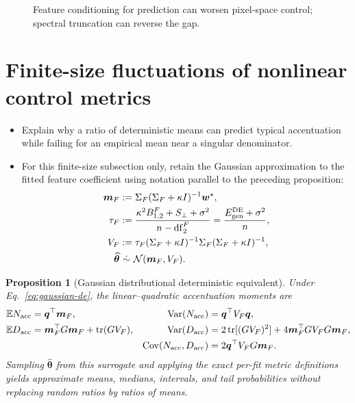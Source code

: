 \documentclass[11pt]{article}
\newtheorem{proposition}[theorem]{Proposition}
\newcommand{\E}{\mathbb{E}}
\newcommand{\tr}{\operatorname{tr}}
\newcommand{\Var}{\operatorname{Var}}
\newcommand{\Cov}{\operatorname{Cov}}
\newcommand{\that}{\widehat{\bm\theta}}
\begin{document}
\begin{figure}[t]
  \centering
  \caption{Feature conditioning for prediction can worsen pixel-space control;
  spectral truncation can reverse the gap.}
  \label{fig:feature-comparison}
\end{figure}

\section{Finite-size fluctuations of nonlinear control metrics}
\label{sec:distributional-de}

\begin{itemize}
  \item Explain why a ratio of deterministic means can predict typical
        accentuation while failing for an empirical mean near a singular
        denominator.
  \item For this finite-size subsection only, retain the Gaussian approximation
        to the fitted feature coefficient using notation parallel to the
        preceding proposition:
  \begin{align}
    \bm m_F
      &:=\Sigma_F(\Sigma_F+\kappa I)^{-1}\bm w^{\star},\\
    \tau_F
      &:=\frac{\kappa^2B^F_{1,2}+S_{\perp}+\sigma^2}
                   {n-\mathrm{df}^{F}_{2}}
       =\frac{E_{\rm gen}^{\rm DE}+\sigma^2}{n},\\
    V_F
      &:=\tau_F(\Sigma_F+\kappa I)^{-1}
                    \Sigma_F(\Sigma_F+\kappa I)^{-1},\\
    \that
      &\ \dot\sim\ \mathcal N(\bm m_F,V_F).
    \label{eq:gaussian-de}
  \end{align}
\end{itemize}

\begin{proposition}[Gaussian distributional deterministic equivalent]
\label{prop:gaussian-de}
Under Eq.~\eqref{eq:gaussian-de}, the linear--quadratic accentuation moments
are
\begin{align}
  \E N_{\rm acc}&=\bm q^{\top}\bm m_F,
  &\Var(N_{\rm acc})&=\bm q^{\top}V_F\bm q,\\
  \E D_{\rm acc}&=\bm m_F^{\top}G\bm m_F+\tr(GV_F),
  &\Var(D_{\rm acc})
    &=2\tr[(GV_F)^2]+4\bm m_F^{\top}GV_FG\bm m_F,\\
  &&\Cov(N_{\rm acc},D_{\rm acc})
    &=2\bm q^{\top}V_FG\bm m_F.
\end{align}
Sampling $\that$ from this surrogate and applying the exact per-fit metric
definitions yields approximate means, medians, intervals, and tail
probabilities without replacing random ratios by ratios of means.
\end{proposition}
\end{document}
